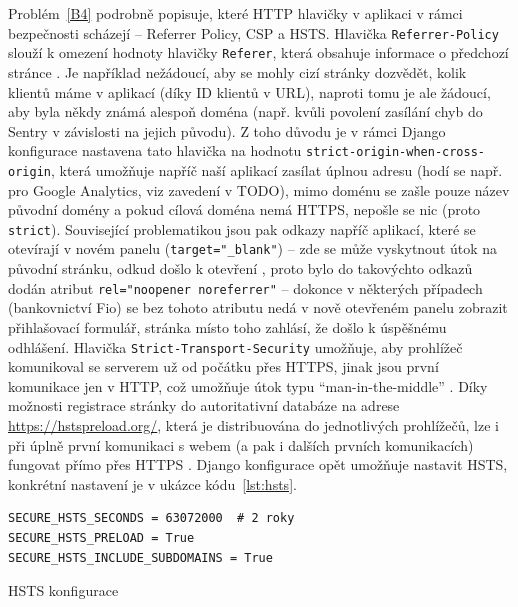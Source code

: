 Problém~\ref{B4} podrobně popisuje, které HTTP hlavičky v aplikaci v rámci bezpečnosti scházejí -- Referrer Policy, CSP a HSTS. Hlavička \verb|Referrer-Policy| slouží k omezení hodnoty hlavičky \verb|Referer|, která obsahuje informace o předchozí stránce \cite{securityheaders-referer}. Je například nežádoucí, aby se mohly cizí stránky dozvědět, kolik klientů máme v aplikací (díky ID klientů v URL), naproti tomu je ale žádoucí, aby byla někdy známá alespoň doména (např. kvůli povolení zasílání chyb do Sentry v závislosti na jejich původu). Z toho důvodu je v rámci Django konfigurace nastavena tato hlavička na hodnotu \verb|strict-origin-when-cross-origin|, která umožňuje napříč naší aplikací zasílat úplnou adresu (hodí se např. pro Google Analytics, viz zavedení v TODO), mimo doménu se zašle pouze název původní domény a pokud cílová doména nemá HTTPS, nepošle se nic (proto \verb|strict|). Související problematikou jsou pak odkazy napříč aplikací, které se otevírají v novém panelu (\verb|target="_blank"|) -- zde se může vyskytnout útok na původní stránku, odkud došlo k otevření \cite{noopener}, proto bylo do takovýchto odkazů dodán atribut \verb|rel="noopener noreferrer"| -- dokonce v některých případech (bankovnictví Fio) se bez tohoto atributu nedá v nově otevřeném panelu zobrazit přihlašovací formulář, stránka místo toho zahlásí, že došlo k úspěšnému odhlášení. Hlavička \verb|Strict-Transport-Security| umožňuje, aby prohlížeč komunikoval se serverem už od počátku přes HTTPS, jinak jsou první komunikace jen v HTTP, což umožňuje útok typu \enquote{man-in-the-middle} \cite{securityheaders-hsts}. Díky možnosti registrace stránky do autoritativní databáze na adrese \href{https://hstspreload.org/}{https://hstspreload.org/}, která je distribuována do jednotlivých prohlížečů, lze i při úplně první komunikaci s webem (a pak i dalších prvních komunikacích) fungovat přímo přes HTTPS \cite{jakpsatweb-hsts}. Django konfigurace opět umožňuje nastavit HSTS, konkrétní nastavení je v ukázce kódu~\ref{lst:hsts}.

\begin{listing}[ht]
	\begin{verbatim}
SECURE_HSTS_SECONDS = 63072000  # 2 roky
SECURE_HSTS_PRELOAD = True
SECURE_HSTS_INCLUDE_SUBDOMAINS = True
	\end{verbatim}
	\caption{HSTS konfigurace}\label{lst:hsts}
\end{listing}

